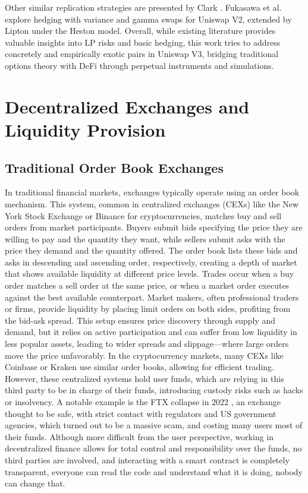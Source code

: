 \documentclass{article}
\begin{document}
Other similar replication strategies are presented by Clark \cite{clark2020}.\newline
Fukasawa et al. \cite{Fukasawa2022} explore hedging with variance and gamma swaps for Uniswap V2, extended by Lipton \cite{lipton2024} under the Heston model.\newline
Overall, while existing literature provides valuable insights into LP risks and basic hedging,  this work tries to address concretely and empirically exotic pairs in Uniswap V3, bridging traditional options theory with DeFi through perpetual instruments and simulations.

\section{Decentralized Exchanges and Liquidity Provision}
\subsection{Traditional Order Book Exchanges}
In traditional financial markets, exchanges typically operate using an order book mechanism. This system, common in centralized exchanges (CEXs) like the New York Stock Exchange or Binance for cryptocurrencies, matches buy and sell orders from market participants. Buyers submit bids specifying the price they are willing to pay and the quantity they want, while sellers submit asks with the price they demand and the quantity offered.
The order book lists these bids and asks in descending and ascending order, respectively, creating a depth of market that shows available liquidity at different price levels. Trades occur when a buy order matches a sell order at the same price, or when a market order executes against the best available counterpart. 
Market makers, often professional traders or firms, provide liquidity by placing limit orders on both sides, profiting from the bid-ask spread.
This setup ensures price discovery through supply and demand, but it relies on active participation and can suffer from low liquidity in less popular assets, leading to wider spreads and slippage—where large orders move the price unfavorably.
In the cryptocurrency markets, many CEXs like Coinbase or Kraken use similar order books, allowing for efficient trading. 
However, these centralized systems hold user funds, which are relying in this third party to be in charge of their funds, introducing custody risks such as hacks or insolvency. 
A notable example is the FTX collapse in 2022 \cite{ftx_collapse}, an exchange thought to be safe, with strict contact with regulators and US government agencies, which turned out to be a massive scam, and costing many users most of their funds. 
Although more difficult from the user perspective, working in decentralized finance allows for total control and responsibility over the funds, no third parties are involved, and interacting with a smart contract is completely transparent, everyone can read the code and understand what it is doing, nobody can change that.
\end{document}
